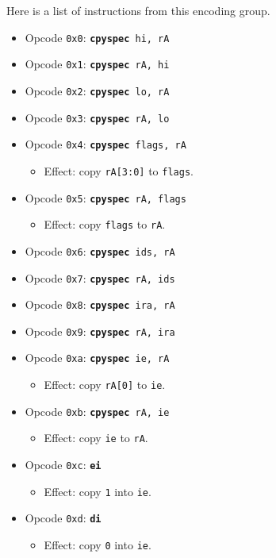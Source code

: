 \documentclass{article}
\begin{document}
	Here is a list of instructions from this encoding group.

	\singlespacing
	\begin{itemize}
		\item Opcode \texttt{0x0}:
			\texttt{\textbf{cpyspec} hi, rA}
		\item Opcode \texttt{0x1}:
			\texttt{\textbf{cpyspec} rA, hi}
		\item Opcode \texttt{0x2}:
			\texttt{\textbf{cpyspec} lo, rA}
		\item Opcode \texttt{0x3}:
			\texttt{\textbf{cpyspec} rA, lo}
		\item Opcode \texttt{0x4}:
			\texttt{\textbf{cpyspec} flags, rA}
		\begin{itemize}
			\item Effect:  copy \texttt{rA[3:0]} to \texttt{flags}.
		\end{itemize}
		\item Opcode \texttt{0x5}:
			\texttt{\textbf{cpyspec} rA, flags}
		\begin{itemize}
			\item Effect:  copy \texttt{flags} to \texttt{rA}.
		\end{itemize}
		\item Opcode \texttt{0x6}:
			\texttt{\textbf{cpyspec} ids, rA}
		\item Opcode \texttt{0x7}:
			\texttt{\textbf{cpyspec} rA, ids}
		\item Opcode \texttt{0x8}:
			\texttt{\textbf{cpyspec} ira, rA}
		\item Opcode \texttt{0x9}:
			\texttt{\textbf{cpyspec} rA, ira}
		\item Opcode \texttt{0xa}:
			\texttt{\textbf{cpyspec} ie, rA}
		\begin{itemize}
			\item Effect:  copy \texttt{rA[0]} to \texttt{ie}.
		\end{itemize}
		\item Opcode \texttt{0xb}:
			\texttt{\textbf{cpyspec} rA, ie}
		\begin{itemize}
			\item Effect:  copy \texttt{ie} to \texttt{rA}.
		\end{itemize}
		\item Opcode \texttt{0xc}:
			\texttt{\textbf{ei}}
		\begin{itemize}
			\item Effect:  copy \texttt{1} into \texttt{ie}.
		\end{itemize}
		\item Opcode \texttt{0xd}:
			\texttt{\textbf{di}}
		\begin{itemize}
			\item Effect:  copy \texttt{0} into \texttt{ie}.
		\end{itemize}
	\end{itemize}
	\doublespacing
\end{document}
